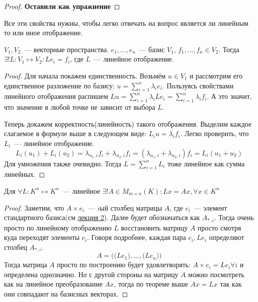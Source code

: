 \begin{proof}
    \textbf{Оставили как упражнение}
\end{proof}
\begin{motivation}
    Все эти свойства нужны, чтобы легко отвечать на вопрос является ли линейным то или иное отображение.
\end{motivation}
\begin{theorem}
    $V_1, V_2$~--- векторные пространства. $e_1,\dots,e_n$~--- базис $V_1$, $f_1,\dots,f_n\in V_2$.
    Тогда $\exists! L: V_1\mapsto V_2\colon Le_i = f_i$, где $L$~--- линейное отображение.
\end{theorem}
\begin{proof}
    Для начала покажем единственность. Возьмём $u\in V_1$ и рассмотрим его единственное разложение по базису:
    $u = \sum\limits_{i=1}^{n}\lambda_ie_i$. Пользуясь свойствами линейного отображения распишем $Lu=
    \sum \limits_{i=1}^{n} \lambda_iLe_i = \sum \limits_{i=1}^{n} \lambda_i f_i$. А это значит, что значение
    в любой точке не зависит от выбора $L$.

    Теперь докажем корректность(линейность) такого отображения. Выделим каждое слагаемое в формуле выше 
    в следующем виде: $L_iu = \lambda_if_i$. Легко проверить, что $L_i$~--- линейное отображение.
    $$L_i(u_1) + L_i(u_2) =
    \lambda_{u_1,i}f_i + \lambda_{u_2,i}f_i=
    (\lambda_{u_1,i}+\lambda_{u_2,i})f_i=L_i(u_1 + u_2)$$
    Для умножения также очевидно. Тогда $L = \sum\limits_{i=1}^{n} L_i$
    тоже линейное как сумма линейных.
\end{proof}
\begin{follow}
    Для $\forall L: K^n\mapsto K^n$~--- линейное 
    $\exists! A\in M_{m\times n}(K)\colon Lx = Ax,\forall x\in K^n$
\end{follow}
\begin{proof}
    Заметим, что $A\times e_i$~--- $i$ый столбец матрицы $A$, где $e_i$~--- элемент стандартного базиса(см \hyperref[2]{лекция 2}).
    Далее будет обозначаться как $A_{*,i}$. Тогда очень просто по линейному отображению $L$ восстановить
    матрицу $A$ просто смотря куда переходят элементы $e_i$.
    Говоря подробнее, каждая пара $e_i, Le_i$ определяют столбец $A_{*,i}$.
    $$A=\Big(\big(Le_1\big),\dots,\big(Le_n\big)\Big)$$
    Тогда матрица $A$ просто по построению будет удовлетворять: $A \times e_i = L e_i \forall i$
    и определена однозначно. Но с другой стороны на матрицу $A$ можно посмотреть как на линейное
    преобразование $Ax$, тогда по теореме выше $Ax=Lx$ так как они совпадают на базисных векторах.
\end{proof}
